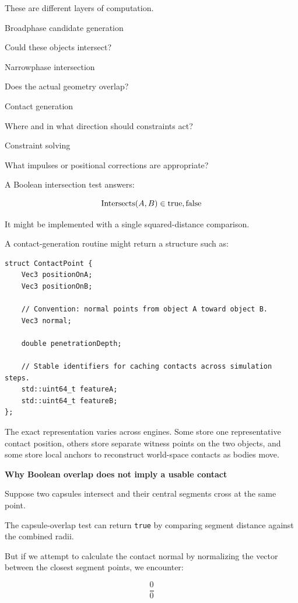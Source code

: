 These are different layers of computation.

Broadphase candidate generation

Could these objects intersect?

Narrowphase intersection

Does the actual geometry overlap?

Contact generation

Where and in what direction should constraints act?

Constraint solving

What impulses or positional corrections are appropriate?

A Boolean intersection test answers:

\[
\operatorname{Intersects}(A,B)\in\\{\mathrm{true},\mathrm{false}\\}
\]

It might be implemented with a single squared-distance comparison.

A contact-generation routine might return a structure such as:

\begin{verbatim}
struct ContactPoint {
    Vec3 positionOnA;
    Vec3 positionOnB;

    // Convention: normal points from object A toward object B.
    Vec3 normal;

    double penetrationDepth;

    // Stable identifiers for caching contacts across simulation steps.
    std::uint64_t featureA;
    std::uint64_t featureB;
};
\end{verbatim}

The exact representation varies across engines. Some store one representative contact position, others store separate witness points on the two objects, and some store local anchors to reconstruct world-space contacts as bodies move.

\textbf{Why Boolean overlap does not imply a usable contact}

Suppose two capsules intersect and their central segments cross at the same point.

The capsule-overlap test can return \texttt{true} by comparing segment distance against the combined radii.

But if we attempt to calculate the contact normal by normalizing the vector between the closest segment points, we encounter:

\[
\frac{0}{0}
\]

